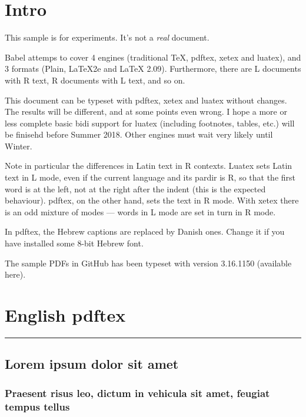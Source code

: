 \documentclass[a4paper]{book}
\newcommand\engine{pdftex}
\newcommand\engine{luatex}
\newcommand\engine{xetex}
\begin{document}
\tableofcontents

\listoffigures


\chapter{Intro}

This sample is for experiments. It's not a \textit{real} document.

Babel attemps to cover 4 engines (traditional \TeX, pdftex, xetex
and luatex), and 3 formats (Plain, \LaTeX 2e and \LaTeX
2.09). Furthermore, there are L documents with R text, R documents
with L text, and so on.

This document can be typeset with pdftex, xetex and luatex without
changes. The results will be different, and at some points even
wrong. I hope a more or less complete basic bidi support for luatex
(including footnotes, tables, etc.) will be finisehd before Summer
2018. Other engines must wait very likely until Winter.

Note in particular the differences in Latin text in R contexts. Luatex
sets Latin text in L mode, even if the current language and its pardir
is R, so that the first word is at the left, not at the right after the
indent (this is the expected behaviour). pdftex, on the other hand,
sets the text in R mode. With xetex there is an odd mixture of modes —
words in L mode are set in turn in R mode.

In pdftex, the Hebrew captions are replaced by Danish ones. Change it
if you have installed some 8-bit Hebrew font.

The sample PDFs in GitHub has been typeset with version 3.16.1150
(available here).


\chapter{English \engine}

\setcounter{section}{25}
\setcounter{table}{34}
\setcounter{page}{56}

\bigskip
\hrule
\bigskip

\section{Lorem ipsum dolor sit amet}
\label{bla}

\subsection{Praesent risus leo, dictum in vehicula sit amet, feugiat
tempus tellus}
\end{document}
